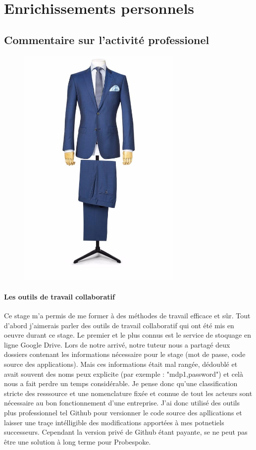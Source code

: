 \section{Enrichissements personnels}
\subsection{Commentaire sur l'activité professionel}
\begin{figure}
\includegraphics[width=8cm]{image/bleuciel.jpg}
\end{figure}
\paragraph{Les outils de travail collaboratif}
Ce stage m'a permis de me former à des méthodes de travail efficace et sûr. Tout d'abord j'aimerais parler des outils de travail collaboratif qui ont été mis en oeuvre durant ce stage. Le premier et le plus connus est le service de stoquage en ligne Google Drive. Lors de notre arrivé, notre tuteur nous a partagé deux dossiers contenant les informations nécessaire pour le stage (mot de passe, code source des applications). Mais ces informations était mal rangée, dédoublé et avait souvent des noms peux explicite (par exemple : "mdp1,password") et celà nous a fait perdre un temps considérable. Je pense donc qu'une classification stricte des resssource et une nomenclature fixée et connue de tout les acteurs sont nécessaire au bon fonctionnement d'une entreprise. J'ai donc utilisé des outils plus professionnel tel Github pour versionner le code source des apllications et laisser une traçe intélligible des modifications apportées à mes potnetiels successeurs. Cependant la version privé de Github étant payante, se ne peut pas être une solution à long terme pour Probespoke.

